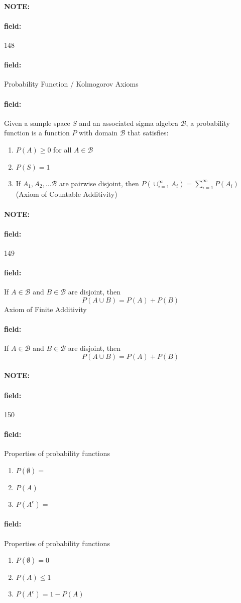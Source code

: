 \documentclass[12pt]{article}
\newenvironment{note}{\paragraph{NOTE:}}{}
\newenvironment{field}{\paragraph{field:}}{}
\begin{document}
\begin{note} \begin{field} \tiny 148 \end{field}
    \begin{field}
        Probability Function / Kolmogorov Axioms
    \end{field}
    \begin{field}
        Given a sample space $S$ and an associated sigma algebra $\mathcal{B}$, a probability function is a function $P$ with domain $\mathcal{B}$ that satisfies:
            \begin{enumerate}
              \item $P(A) \geq 0$ for all $A \in \mathcal{B}$
              \item $P(S) = 1$
              \item If $A_1, A_2, \ldots \mathcal{B}$ are pairwise disjoint, then $P(\cup_{i=1}^\infty A_i) = \sum_{i=1}^\infty P(A_i)$ (Axiom of Countable Additivity)
            \end{enumerate}
    \end{field}
\end{note}

\begin{note} \begin{field} \tiny 149 \end{field}
    \begin{field}
      If $A\in \mathcal{B}$ and $B \in \mathcal{B}$ are disjoint, then
          $$P(A\cup B) = P(A) + P(B) $$
        Axiom of Finite Additivity
    \end{field}
    \begin{field}
        If $A\in \mathcal{B}$ and $B \in \mathcal{B}$ are disjoint, then
            $$P(A\cup B) = P(A) + P(B) $$
    \end{field}
\end{note}

\begin{note} \begin{field} \tiny 150 \end{field}
    \begin{field}
        Properties of probability functions
        \begin{enumerate}
              \item $P(\emptyset) = $
              \item $P(A) $
              \item $P(A^c) = $
            \end{enumerate}
    \end{field}
    \begin{field}
      Properties of probability functions
        \begin{enumerate}
              \item $P(\emptyset) = 0$
              \item $P(A) \leq 1$
              \item $P(A^c) = 1 - P(A)$
            \end{enumerate}
    \end{field}
\end{note}
\end{document}
